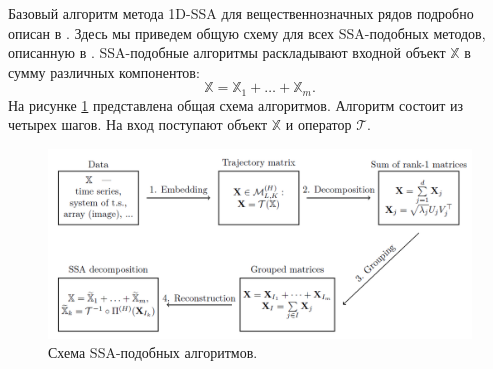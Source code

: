 \documentclass[specialist,
               substylefile = spbu.rtx,
               subf,href,colorlinks=true, 12pt]{disser}
\begin{document}
Базовый алгоритм метода 1D-SSA для вещественнозначных рядов подробно описан в \cite{Golyandina.etal2001}.
Здесь мы приведем общую схему для всех SSA-подобных методов, описанную в \cite{Rssa}.
SSA-подобные алгоритмы раскладывают входной объект $\mathbb{X}$ в сумму различных компонентов:
\begin{equation*}
\mathbb{X} = {\mathbb{X}}_1 + \ldots + {\mathbb{X}}_m.
\end{equation*}
На рисунке \ref{fig:ssa_scheme} представлена общая схема алгоритмов.
Алгоритм состоит из четырех шагов. На вход поступают объект $\mathbb{X}$ и оператор $\mathcal{T}$.
\begin{figure}[!hhh]
	\begin{center}
	\includegraphics[width = 6in]{scheme_ssa}
	\end{center}
	\caption{Схема SSA-подобных алгоритмов.}
	\label{fig:ssa_scheme}
\end{figure}
\end{document}
